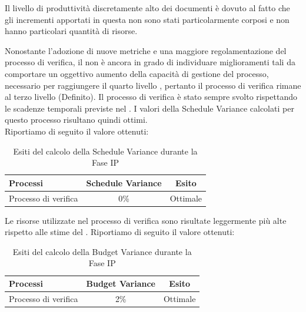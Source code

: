 	Il livello di produttività discretamente alto dei documenti è dovuto al fatto che gli incrementi apportati in questa  non sono stati particolarmente corposi e non hanno particolari quantità di risorse.

		Nonostante l'adozione di nuove metriche e una maggiore regolamentazione del processo di verifica, il  non è ancora in grado di individuare miglioramenti tali da comportare un oggettivo aumento della capacità di gestione del processo, necessario per raggiungere il quarto livello , pertanto il processo di verifica rimane al terzo livello (Definito).
		Il processo di verifica è stato sempre svolto rispettando le scadenze temporali previste nel . I valori della Schedule Variance calcolati per questo processo risultano quindi ottimi.\\
				Riportiamo di seguito il valore ottenuti:
				\begin{table}[H]
					\centering
					\begin{tabu}{| l | c | c |}
						\hline
							Processi 							& Schedule Variance	& Esito		\\ \hline \hline
							Processo di verifica & 0\% & Ottimale \\ \hline
					\end{tabu}
					\caption{Esiti del calcolo della Schedule Variance durante la Fase IP}
				\end{table}	

	Le risorse utilizzate nel processo di verifica sono risultate leggermente più alte rispetto alle stime del .
	Riportiamo di seguito il valore ottenuti:
	\begin{table}[H]
		\centering
		\begin{tabu}{| l | c | c |}
		\hline
		Processi 							& Budget Variance	& Esito		\\ \hline \hline
		Processo di verifica & 2\% & Ottimale \\ \hline
		\end{tabu}
		\caption{Esiti del calcolo della Budget Variance durante la Fase IP}
	\end{table}	

